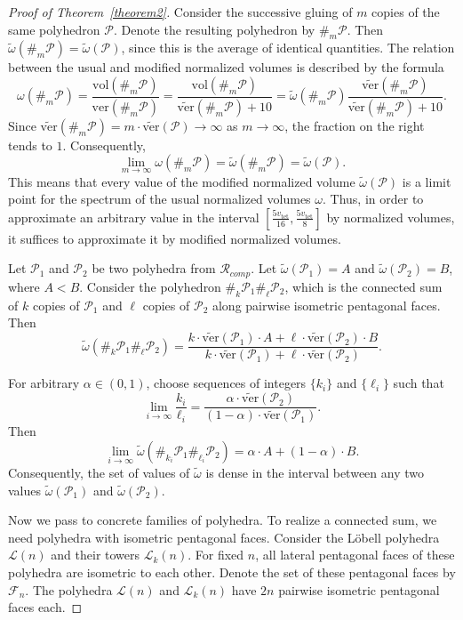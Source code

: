 \documentclass{amsart}
\newcommand{\vol}{\mathrm{vol}}
\newcommand{\tomega}{\widetilde{\omega}}
\newcommand{\tN}{\widetilde{\ver}}
\newcommand{\vtet}{v_{\mathrm{tet}}}
\newcommand{\ver}{\mathrm{ver}}
\begin{document}
\begin{proof}[Proof of Theorem~\ref{theorem2}]
		Consider the successive gluing of $m$ copies of the same polyhedron $\mathcal P$. Denote the resulting polyhedron by $\#_m \mathcal P$.
	Then $\tomega(\#_m \mathcal P) = \tomega(\mathcal P)$, since this is the average of identical quantities.
		The relation between the usual and modified normalized volumes is described by the formula
	$$
	\omega(\#_m \mathcal P) = \frac{\vol(\#_m \mathcal P)}{\ver(\#_m \mathcal P)} = \frac{\vol(\#_m \mathcal P)}{\tN(\#_m \mathcal P) + 10} = \tomega(\#_m \mathcal P ) \frac{\tN(\#_m \mathcal P)}{\tN(\#_m \mathcal P)+10}.
	$$
	Since $\tN(\#_m \mathcal  P) = m \cdot \tN(\mathcal  P) \to \infty$ as $m \to \infty$, the fraction on the right tends to $1$.
	Consequently,
	$$ 
	\lim_{m \to \infty} \omega(\#_m \mathcal P) = \tomega(\#_m \mathcal P) = \tomega(\mathcal P).
	$$
		This means that every value of the modified normalized volume $\tomega(\mathcal P)$ is a limit point for the spectrum of the usual normalized volumes $\omega$.
		Thus, in order to approximate an arbitrary value in the interval $[\frac{5\vtet}{16}, \frac{5\vtet}{8}]$ by normalized volumes, it suffices to approximate it by modified normalized volumes.

	Let $\mathcal P_1$ and $\mathcal P_2$ be two polyhedra from $\mathcal R_{comp}$.
	Let $\tomega(\mathcal P_1) = A$ and $\tomega(\mathcal P_2) = B$, where $A<B$.
		Consider the polyhedron $\#_k \mathcal P_1 \#_{\ell} \mathcal P_2$, which is the connected sum of $k$ copies of $\mathcal P_1$ and $\ell$ copies of $\mathcal P_2$ along pairwise isometric pentagonal faces. Then
	$$
	\tomega(\#_k \mathcal P_1 \#_{\ell} \mathcal P_2) = \frac{k \cdot \tN(\mathcal  P_1) \cdot A + \ell \cdot \tN(\mathcal P_2) \cdot B}{k \cdot \tN(\mathcal P_1) + \ell \cdot \tN(\mathcal P_2)}.
	$$
	
		For arbitrary $\alpha \in (0,1)$, choose sequences of integers $\{k_i\}$ and $\{ \ell_i\}$ such that
	$$
	\lim_{i\to \infty} \frac{k_i}{\ell_i} = \frac{\alpha \cdot \tN(\mathcal P_2)}{(1-\alpha) \cdot \tN(\mathcal P_1)}.
	$$
	Then 
	$$
	\lim_{i \to \infty} \tomega(\#_{k_i} \mathcal P_1 \#_{\ell_i} \mathcal P_2) = \alpha \cdot A + (1-\alpha) \cdot B.
	$$
	Consequently, the set of values of $\tomega$ is dense in the interval between any two values $\tomega(\mathcal P_1)$ and $\tomega(\mathcal P_2)$.

	Now we pass to concrete families of polyhedra.
		To realize a connected sum, we need polyhedra with isometric pentagonal faces.
		Consider the L\"obell polyhedra $\mathcal L(n)$ and their towers $\mathcal L_k(n)$.
		For fixed $n$, all lateral pentagonal faces of these polyhedra are isometric to each other. Denote the set of these pentagonal faces by $\mathcal{F}_n$.
		The polyhedra $\mathcal L(n)$ and $\mathcal L_k(n)$ have $2n$ pairwise isometric pentagonal faces each.


\end{proof}
\end{document}
